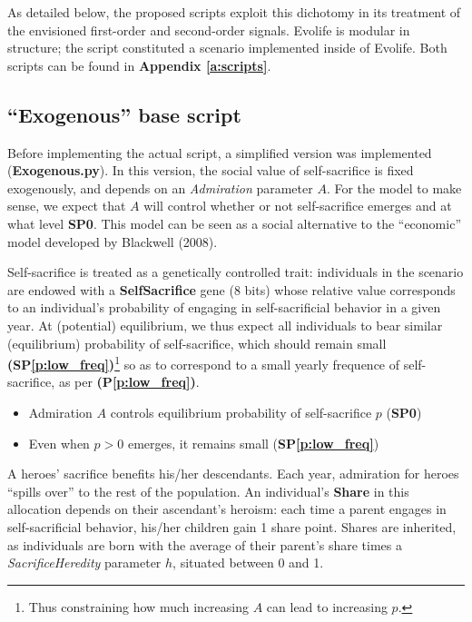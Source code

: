 \documentclass[a4paper,12pt]{report}
\begin{document}
As detailed below,
the proposed scripts exploit
this dichotomy in its treatment of the envisioned
first-order and second-order signals. Evolife is modular in structure;
the script constituted a scenario implemented inside of Evolife.
Both scripts can be found in \textbf{Appendix 
    \ref{a:scripts}}.

\subsection{“Exogenous” base script}
Before implementing the actual script, a simplified version was
implemented (\textbf{Exogenous.py}). In this version, the social value of self-sacrifice
is fixed exogenously, and depends on an \emph{Admiration} parameter $A$.
For the model to make sense, we expect that $A$ will control
whether or not self-sacrifice emerges and at what level \textbf{SP0}.
This model can be seen as a social alternative to the
“economic” model developed by Blackwell (2008).

Self-sacrifice is treated as a genetically controlled trait:
individuals in the scenario are endowed with a \textbf{SelfSacrifice} gene (8 bits)
whose relative value corresponds to an individual’s probability of
engaging in self-sacrificial behavior in a given year. 
At (potential) equilibrium, we thus expect all individuals to bear similar (equilibrium)
probability of self-sacrifice, which should remain small \textbf{(SP\ref{p:low_freq})}\footnote{
    Thus constraining how much increasing $A$ can lead to increasing $p$.
}
so as to correspond
to a small yearly frequence of self-sacrifice, as per \textbf{(P\ref{p:low_freq})}.

\begin{spe_predict*}
    \label{p:low_proba}
    \leavevmode
    \begin{itemize}
        \item Admiration $A$ controls equilibrium probability of self-sacrifice $p$
         (\textbf{SP0})
        \item Even when $p>0$ emerges, it remains small (\textbf{SP\ref{p:low_freq}})
    \end{itemize}
\end{spe_predict*}

A heroes’ sacrifice benefits his/her descendants.
Each year, admiration for heroes “spills over” to the rest of the population.
An individual’s \textbf{Share} in this allocation depends on their ascendant’s heroism:
each time a parent engages in self-sacrificial behavior,
his/her children gain 1 share point.
Shares are inherited, as individuals are born with the average of their parent’s
share times a \emph{SacrificeHeredity} parameter $h$, situated between 0 and 1.
\end{document}
